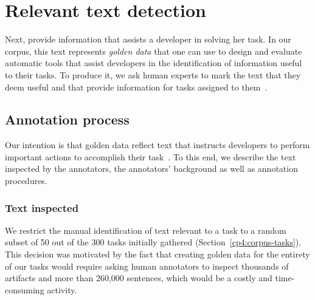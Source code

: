 


\section{Relevant text detection}
\label{cp4:corpus-relevant-text}






Next,  provide information that assists a developer in solving her task.
In our corpus, this text represents \textit{golden data} that one can use to design and evaluate automatic tools that assist developers in the identification of information useful to their tasks. 
To produce it, we 
ask human experts to
mark the text that they deem useful and that provide information for tasks assigned to them~\cite{nadi2020, Robillard2015, marques2020}.



\subsection{Annotation process}


Our intention is that golden data reflect text that instructs developers to perform important actions to accomplish their task~\cite{Robillard2015, Lotufo2012}.
To this end, we describe the text inspected by the annotators, the annotators' background as well as annotation procedures.
\textcolor{white}{\acs{stdv}} %



\subsubsection{Text inspected}




We restrict the manual identification of text relevant to a task to a random subset of 
50  out of the 300  tasks initially gathered (Section~\ref{cp4:corpus-tasks}).
This decision was motivated by the fact that 
creating golden data for the entirety of our tasks 
would require asking human annotators to inspect thousands of artifacts and more than 260,000 sentences, which would be a costly and time-consuming activity. 





